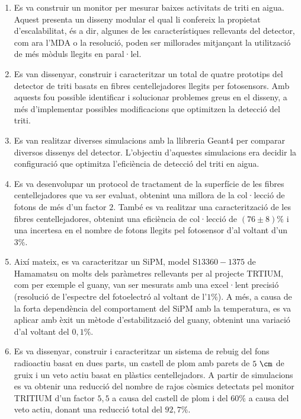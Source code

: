 \begin{enumerate}

\item{} Es va construir un monitor per mesurar baixes activitats de triti en aigua. Aquest presenta un disseny modular el qual li confereix la propietat d'escalabilitat, és a dir, algunes de les característiques rellevants del detector, com ara l'MDA o la resolució, poden ser millorades mitjançant la utilització de més mòduls llegits en paral·lel.

\item{} Es van dissenyar, construir i caracteritzar un total de quatre prototips del detector de triti basats en fibres centellejadores llegits per fotosensors. Amb aquests fou possible identificar i solucionar problemes greus en el disseny, a més d'implementar possibles modificacions que optimitzen la detecció del triti.

\item{} Es van realitzar diverses simulacions amb la llibreria Geant4 per comparar diversos dissenys del detector. L'objectiu d'aquestes simulacions era decidir la configuració que optimitza l'eficiència de detecció del triti en aigua.

\item{} Es va desenvolupar un protocol de tractament de la superfície de les fibres centellejadores que va ser evaluat, obtenint una millora de la col·lecció de fotons de més d'un factor $2$. També es va realitzar una caracterització de les fibres centellejadores, obtenint una eficiència de col·lecció de $(76 \pm 8)\%$ i una incertesa en el nombre de fotons llegits pel fotosensor d'al voltant d'un $3\%$.

\item{} Així mateix, es va caracteritzar un SiPM, model S$13360-1375$ de Hamamatsu on molts dels paràmetres rellevants per al projecte TRTIUM, com per exemple el guany, van ser mesurats amb una excel·lent precisió (resolució de l'espectre del fotoelectró al voltant de l'$1\%$). A més, a causa de la forta dependència del comportament del SiPM amb la temperatura, es va aplicar amb èxit un mètode d'estabilització del guany, obtenint una variació d'al voltant del $0,1\%$.

\item{} Es va dissenyar, construir i caracteritzar un sistema de rebuig del fons radioactiu basat en dues parts, un castell de plom amb parets de $5~\cm$ de gruix i un veto actiu basat en plàstics centellejadors. A partir de simulacions es va obtenir una reducció del nombre de rajos còsmics detectats pel monitor TRITIUM d'un factor $5,5$ a causa del castell de plom i del $60\%$ a causa del veto actiu, donant una reducció total del $92,7\%$.


\end{enumerate}
